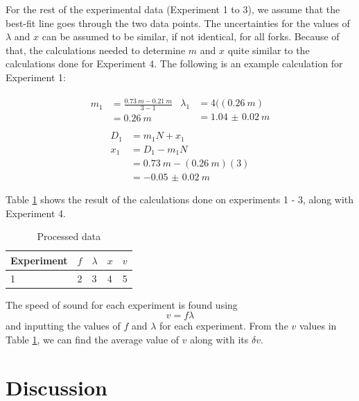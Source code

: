 \documentclass[letter]{article}
\numberwithin{equation}{section}
\numberwithin{figure}{section}
\numberwithin{table}{section}
\begin{document}
For the rest of the experimental data (Experiment 1 to 3), we assume that the best-fit line goes through the two data points. The uncertainties for the values of \(\lambda\) and \(x\) can be assumed to be similar, if not identical, for all forks. Because of that, the calculations needed to determine \(m\) and \(x\) quite similar to the calculations done for Experiment 4. The following is an example calculation for Experiment 1:

\begin{align*}
  \begin{split}
    m_1 &= \frac{\SI{0.73}{m} - \SI{0.21}{m}}{3 - 1} \\
    &= \SI{0.26}{m}
  \end{split} 
  \begin{split}
    \lambda_1 &= 4((\SI{0.26}{m}) \\
    &= \SI{1.04(2)}{m}
  \end{split} \\
\end{align*}
\begin{equation*}
  \begin{split}
    D_1 &= m_1 N + x_1 \\ 
    x_1 &= D_1 - m_1 N \\
    &= \SI{0.73}{m} - (\SI{0.26}{m})(3) \\
    &= \SI{-0.05(2)}{m}
  \end{split}
\end{equation*}

Table \ref{table:a1} shows the result of the calculations done on experiments 1 - 3, along with Experiment 4.

\begin{table}[h]
  \centering
  \begin{tabular}{|l|l|l|l|l|}
    \hline
    Experiment & \(f\) & \(\lambda\) & \(x\) & \(v\) \\
    \hline
    1 & 2 & 3 & 4 & 5 \\
    \hline
  \end{tabular}
  \caption{Processed data}
  \label{table:a1}
\end{table}

The speed of sound for each experiment is found using 
\begin{equation}
v = f \lambda
\end{equation}
and inputting the values of \(f\) and \(\lambda\) for each experiment. From the \(v\) values in Table \ref{table:a1}, we can find the average value of \(v\) along with its \(\delta v\).
\section{Discussion}
\end{document}
